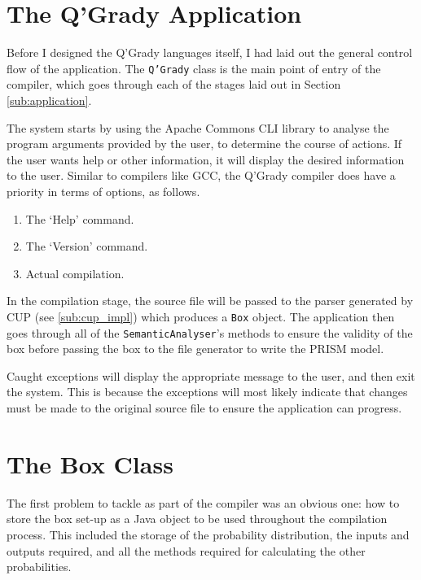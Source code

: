 \documentclass[report.tex]{subfiles}
\begin{document}

\section{The Q'Grady Application} %
\label{sec:the_q_grady_application}
Before I designed the Q'Grady languages itself, I had laid out the general
control flow of the application. The \texttt{Q'Grady} class is the main point of
entry of the compiler, which goes through each of the stages laid out in Section
\ref{sub:application}.

The system starts by using the Apache Commons CLI library to analyse the
program arguments provided by the user, to determine the course of actions. If
the user wants help or other information, it will display the desired
information to the user. Similar to compilers like GCC, the Q'Grady compiler
does have a priority in terms of options, as follows.
\begin{enumerate}
    \item The `Help' command.
    \item The `Version' command.
    \item Actual compilation.
\end{enumerate}

In the compilation stage, the source file will be passed to the parser generated
by CUP (see \ref{sub:cup_impl}) which produces a \texttt{Box} object. The
application then goes through all of the \texttt{SemanticAnalyser}'s methods to
ensure the validity of the box before passing the box to the file generator to
write the PRISM model. 

Caught exceptions will display the appropriate message to the user, and then
exit the system. This is because the exceptions will most likely indicate that
changes must be made to the original source file to ensure the application can
progress.

\section{The Box Class} %
\label{sec:the_box_class}
The first problem to tackle as part of the compiler was an obvious one: how to
store the box set-up as a Java object to be used throughout the compilation
process. This included the storage of the probability distribution, the inputs
and outputs required, and all the methods required for calculating the other
probabilities.
\end{document}
